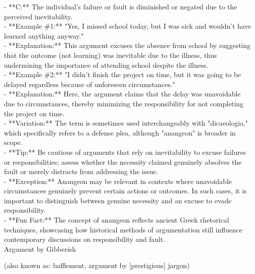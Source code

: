 \documentclass[a4paper,12pt,single,pdftex]{scrartcl}
\begin{document}
    
        - **C:** The individual’s failure or fault is diminished or negated due to the perceived inevitability.
    \\

    
      - **Example \#1:** "Yes, I missed school today, but I was sick and wouldn't have learned anything anyway."
    \\

    
      - **Explanation:** This argument excuses the absence from school by suggesting that the outcome (not learning) was inevitable due to the illness, thus undermining the importance of attending school despite the illness.
    \\

    
      - **Example \#2:** "I didn’t finish the project on time, but it was going to be delayed regardless because of unforeseen circumstances."
    \\

    
      - **Explanation:** Here, the argument claims that the delay was unavoidable due to circumstances, thereby minimizing the responsibility for not completing the project on time.
    \\

    
      - **Variation:** The term is sometimes used interchangeably with "dicaeologia," which specifically refers to a defense plea, although "anangeon" is broader in scope.
    \\

    
      - **Tip:** Be cautious of arguments that rely on inevitability to excuse failures or responsibilities; assess whether the necessity claimed genuinely absolves the fault or merely distracts from addressing the issue.
    \\

    
      - **Exception:** Anangeon may be relevant in contexts where unavoidable circumstances genuinely prevent certain actions or outcomes. In such cases, it is important to distinguish between genuine necessity and an excuse to evade responsibility.
    \\

    
      - **Fun Fact:** The concept of anangeon reflects ancient Greek rhetorical techniques, showcasing how historical methods of argumentation still influence contemporary discussions on responsibility and fault.
    \\

  

Argument by Gibberish
    
      (also known as: bafflement, argument by [prestigious] jargon)
    \\
\end{document}
